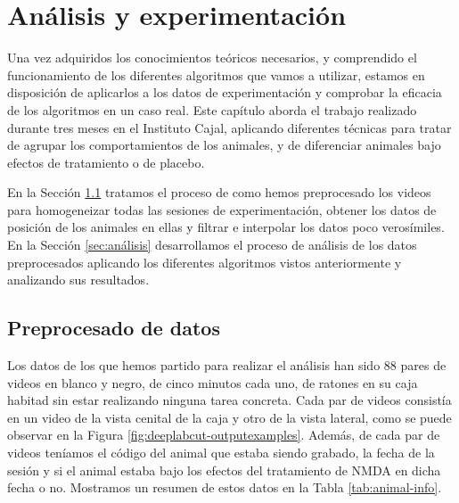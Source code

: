 \chapter{Análisis y experimentación}
\label{chap:analisis-y-experimentacion}

Una vez adquiridos los conocimientos teóricos necesarios, y comprendido el funcionamiento de los diferentes algoritmos que vamos a utilizar, estamos en disposición de aplicarlos a los datos de experimentación y comprobar la eficacia de los algoritmos en un caso real. Este capítulo aborda el trabajo realizado durante tres meses en el Instituto Cajal, aplicando diferentes técnicas para tratar de agrupar los comportamientos de los animales, y de diferenciar animales bajo efectos de tratamiento o de placebo.

En la Sección \ref{sec:preprocesado} tratamos el proceso de como hemos preprocesado los videos para homogeneizar todas las sesiones de experimentación, obtener los datos de posición de los animales en ellas y filtrar e interpolar los datos poco verosímiles. En la Sección \ref{sec:análisis} desarrollamos el proceso de análisis de los datos preprocesados aplicando los diferentes algoritmos vistos anteriormente y analizando sus resultados.

\section{Preprocesado de datos} \label{sec:preprocesado}

Los datos de los que hemos partido para realizar el análisis han sido 88 pares de videos en blanco y negro, de cinco minutos cada uno, de ratones en su caja habitad sin estar realizando ninguna tarea concreta. Cada par de videos consistía en un video de la vista cenital de la caja y otro de la vista lateral, como se puede observar en la Figura \ref{fig:deeplabcut-outputexamples}. Además, de cada par de videos teníamos el código del animal que estaba siendo grabado, la fecha de la sesión y si el animal estaba bajo los efectos del tratamiento de NMDA en dicha fecha o no. Mostramos un resumen de estos datos en la Tabla \ref{tab:animal-info}.

